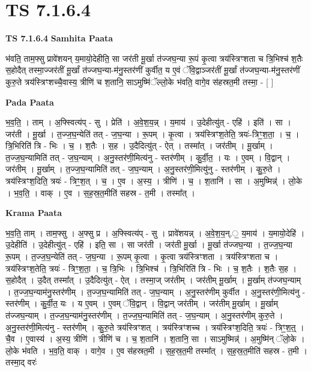 \documentclass[17pt]{extarticle}
\begin{document}
\section{ TS 7.1.6.4 }

\textbf{TS 7.1.6.4 } \newline
\textbf{Samhita Paata} \newline

भ॑वति॒ ताम॒फ्सु प्रावे॑शयन् य॒मायो॒देहीति॒ सा जर॑ती मू॒र्खा त॑ज्जघ॒न्या रू॒पं कृ॒त्वा त्रय॑स्त्रिꣳशता च त्रि॒भिश्च॑ श॒तैः स॒होदैत् तस्मा॒ज्जर॑तीं मू॒र्खां त॑ज्जघ॒न्या-म॑नु॒स्तर॑णीं कुर्वीत॒ य ए॒वं ॅवि॒द्वाञ्जर॑तीं मू॒र्खां त॑ज्जघ॒न्या-म॑नु॒स्तर॑णीं कुरु॒ते त्रय॑स्त्रिꣳशच्चै॒वास्य॒ त्रीणि॑ च श॒तानि॒ साऽमुष्मि॑ॅल्लो॒के भ॑वति॒ वागे॒व स॑हस्रत॒मी तस्मा॒ - [  ] \newline

\textbf{Pada Paata} \newline

भ॒व॒ति॒ । ताम् । अ॒फ्स्वित्य॑प् - सु । प्रेति॑ । अ॒वे॒श॒य॒न्न् । य॒माय॑ । उ॒देहीत्यु॑त् - एहि॑ । इति॑ । सा । जर॑ती । मू॒र्खा । त॒ज्ज॒घ॒न्येति॑ तत् - ज॒घ॒न्या । रू॒पम् । कृ॒त्वा । त्रय॑स्त्रिꣳश॒तेति॒ त्रयः॑-त्रिꣳ॒॒श॒ता॒ । च॒ । त्रि॒भिरिति॑ त्रि - भिः । च॒ । श॒तैः । स॒ह । उ॒दैदित्यु॑त् - ऐत् । तस्मा᳚त् । जर॑तीम् । मू॒र्खाम् । त॒ज्ज॒घ॒न्यामिति॑ तत् - ज॒घ॒न्याम् । अ॒नु॒स्तर॑णी॒मित्य॑नु - स्तर॑णीम् । कु॒र्वी॒त॒ । यः । ए॒वम् । वि॒द्वान् । जर॑तीम् । मू॒र्खाम् । त॒ज्ज॒घ॒न्यामिति॑ तत् - ज॒घ॒न्याम् । अ॒नु॒स्तर॑णी॒मित्यु॑नु - स्तर॑णीम् । कु॒रु॒ते । त्रय॑स्त्रिꣳश॒दिति॒ त्रयः॑ - त्रिꣳ॒॒श॒त् । च॒ । ए॒व । अ॒स्य॒ । त्रीणि॑ । च॒ । श॒तानि॑ । सा । अ॒मुष्मिन्न्॑ । लो॒के । भ॒व॒ति॒ । वाक् । ए॒व । स॒ह॒स्र॒त॒मीति॑ सहस्र - त॒मी । तस्मा᳚त् ।  \newline


\textbf{Krama Paata} \newline

भ॒व॒ति॒ ताम् । ताम॒फ्सु । अ॒फ्सु प्र । अ॒फ्स्वित्य॑प् - सु । प्रावे॑शयन्न् । अ॒वे॒श॒य॒न्.॒ य॒माय॑ । य॒मायो॒देहि॑ । उ॒देहीति॑ । उ॒देहीत्यु॑त् - एहि॑ । इति॒ सा । सा जर॑ती । जर॑ती मू॒र्खा । मू॒र्खा त॑ज्जघ॒न्या । त॒ज्ज॒घ॒न्या रू॒पम् । त॒ज्ज॒घ॒न्येति॑ तत् - ज॒घ॒न्या । रू॒पम् कृ॒त्वा । कृ॒त्वा त्रय॑स्त्रिꣳशता । त्रय॑स्त्रिꣳशता च । त्रय॑स्त्रिꣳश॒तेति॒ त्रयः॑ - त्रिꣳ॒॒श॒ता॒ । च॒ त्रि॒भिः । त्रि॒भिश्च॑ । त्रि॒भिरिति॑ त्रि - भिः । च॒ श॒तैः । श॒तैः स॒ह । स॒होदैत् । उ॒दैत् तस्मा᳚त् । उ॒दैदित्यु॑त् - ऐत् । तस्मा॒ज् जर॑तीम् । जर॑तीम् मू॒र्खाम् । मू॒र्खाम् त॑ज्जघ॒न्याम् । त॒ज्ज॒घ॒न्याम॑नु॒स्तर॑णीम् । त॒ज्ज॒घ॒न्यामिति॑ तत् - ज॒घ॒न्याम् । अ॒नु॒स्तर॑णीम् कुर्वीत । अ॒नु॒स्तर॑णी॒मित्य॑नु - स्तर॑णीम् । कु॒र्वी॒त॒ यः । य ए॒वम् । ए॒वम् ॅवि॒द्वान् । वि॒द्वान् जर॑तीम् । जर॑तीम् मू॒र्खाम् । मू॒र्खाम् त॑ज्जघ॒न्याम् । त॒ज्ज॒घ॒न्याम॑नु॒स्तर॑णीम् । त॒ज्ज॒घ॒न्यामिति॑ तत् - ज॒घ॒न्याम् । अ॒नु॒स्तर॑णीम् कुरु॒ते । अ॒नु॒स्तर॑णी॒मित्य॑नु - स्तर॑णीम् । कु॒रु॒ते त्रय॑स्त्रिꣳशत् । त्रय॑स्त्रिꣳशच्च । त्रय॑स्त्रिꣳश॒दिति॒ त्रयः॑ - त्रिꣳ॒॒श॒त्॒ । चै॒व । ए॒वास्य॑ । अ॒स्य॒ त्रीणि॑ । त्रीणि॑ च । च॒ श॒तानि॑ । श॒तानि॒ सा । साऽमुष्मिन्न्॑ । अ॒मुष्मि॑न् ॅलो॒के । लो॒के भ॑वति । भ॒व॒ति॒ वाक् । वागे॒व । ए॒व स॑हस्रत॒मी । स॒ह॒स्र॒त॒मी तस्मा᳚त् । स॒ह॒स्र॒त॒मीति॑ सहस्र - त॒मी । तस्मा॒द् वरः॑ \newline
\end{document}
